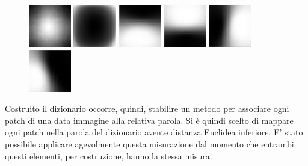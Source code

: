 \documentclass[]{report}
\begin{document}
	\begin{figure}[ht!]
		\includegraphics[width=.16\textwidth,height=70px]{./img/bow1s}\hfill
		\includegraphics[width=.16\textwidth,height=70px]{./img/bow2s}\hfill
		\includegraphics[width=.16\textwidth,height=70px]{./img/bow3s}\hfill
		\includegraphics[width=.16\textwidth,height=70px]{./img/bow4s}\hfill
		\includegraphics[width=.16\textwidth,height=70px]{./img/bow5s}\hfill
		\includegraphics[width=.16\textwidth,height=70px]{./img/bow6s}
	\end{figure} 
	
	Costruito il dizionario occorre, quindi, stabilire un metodo per associare ogni patch di una data immagine alla relativa parola. Si è quindi scelto di mappare ogni patch nella parola del dizionario avente distanza Euclidea inferiore. E' stato possibile applicare agevolmente questa misurazione dal momento che entrambi questi elementi, per costruzione, hanno la stessa misura. 
	
\end{document}
